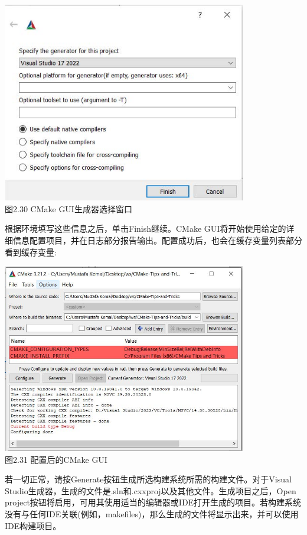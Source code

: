 \begin{center}
\includegraphics[width=0.8\textwidth]{content/1/chapter2/images/30.jpg}\\
图2.30 CMake GUI生成器选择窗口
\end{center}

根据环境填写这些信息之后，单击Finish继续。CMake GUI将开始使用给定的详细信息配置项目，并在日志部分报告输出。配置成功后，也会在缓存变量列表部分看到缓存变量:

\begin{center}
\includegraphics[width=0.8\textwidth]{content/1/chapter2/images/31.jpg}\\
图2.31 配置后的CMake GUI
\end{center}

若一切正常，请按Generate按钮生成所选构建系统所需的构建文件。对于Visual Studio生成器，生成的文件是.sln和.cxxproj以及其他文件。生成项目之后，Open project按钮将启用，可用其使用适当的编辑器或IDE打开生成的项目。若构建系统没有与任何IDE关联(例如，makefiles)，那么生成的文件将显示出来，并可以使用IDE构建项目。

